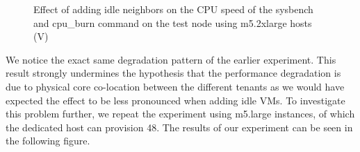 \begin{figure}[H]
\centering
{}
\caption{Effect of adding idle neighbors on the CPU speed of the sysbench and cpu\_burn command on the test node using m5.2xlarge hosts (V)} 
\end{figure}
\noindent
We notice the exact same degradation pattern of the earlier experiment. This result strongly undermines 
the hypothesis that the performance degradation is due to physical core co-location between the different 
tenants as we would have expected the effect to be less pronounced when adding idle VMs. To investigate 
this problem further, we repeat the experiment using m5.large instances, of which the dedicated host can 
provision 48. The results of our experiment can be seen in the following figure. 

